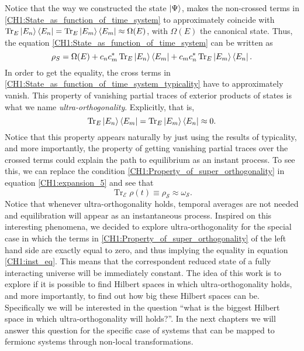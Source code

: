\indent  Notice that the way we constructed the state $\mathinner{|{\Psi}\rangle}$, makes the non-crossed terms in \eqref{CH1:State_as_function_of_time_system} to approximately  coincide with $\operatorname{Tr}_E \mathinner{|{E_n}\rangle}\mathinner{\langle{E_n}|} =\operatorname{Tr}_E \mathinner{|{E_m}\rangle}\mathinner{\langle{E_m}|} \approx \Omega(E)$, with $\Omega(E)$ the canonical state. Thus, the equation \eqref{CH1:State_as_function_of_time_system} can be written as
\begin{equation}
\rho_S= \Omega(E) + c_n c^{*}_m  \operatorname{Tr}_E \mathinner{|{E_n}\rangle}\mathinner{\langle{E_m}|} + c_m c^{*}_n \operatorname{Tr}_E \mathinner{|{E_m}\rangle}\mathinner{\langle{E_n}|}.
\label{CH1:State_as_function_of_time_system_typicality}
\end{equation}
In order to get the equality, the cross terms in \eqref{CH1:State_as_function_of_time_system_typicality} have to  approximately vanish. This property of vanishing partial traces of exterior products of states is what we name \textit{ultra-orthogonality}. Explicitly, that is,
\begin{equation}
\operatorname{Tr}_E \mathinner{|{E_n}\rangle}\mathinner{\langle{E_m}|} = \operatorname{Tr}_E \mathinner{|{E_m}\rangle}\mathinner{\langle{E_n}|} \approx  0.
\label{CH1:Property_of_super_orthogonality}
\end{equation}
Notice that this property appears naturally by just using the results of typicality, and more importantly, the property of getting vanishing partial traces over the crossed terms could explain the path to equilibrium as an instant process. To see this, we can replace the condition \eqref{CH1:Property_of_super_orthogonality} in equation \eqref{CH1:expansion_5} and see that
\begin{equation}
\operatorname{Tr}_{\mathcal{E}}\rho(t)\equiv \rho_{\mathcal{S}} \approx \omega_{\mathcal{S}}.
\label{CH1:inst_eq}
\end{equation}
Notice that whenever ultra-orthogonality holds, temporal averages are not needed and equilibration will appear as an instantaneous process. Inspired on this interesting phenomena, we decided to explore ultra-orthogonality for the special case in which the terms in \eqref{CH1:Property_of_super_orthogonality} of the left hand side are exactly equal to zero, and thus implying the equality in equation \eqref{CH1:inst_eq}. This means that the correspondent reduced state of a fully interacting universe will be immediately constant. The idea of this work is to explore if it is possible to find Hilbert spaces in which ultra-orthogonality holds, and more importantly, to find out how big these Hilbert spaces can be.\\
\indent Specifically we will be interested in the question ``what is the biggest Hilbert space in which ultra-orthogonality will holds?''. In the next chapters we will  answer this question for the specific case of systems that can be mapped to fermionc systems through non-local transformations. %
